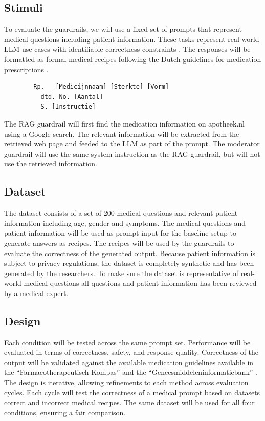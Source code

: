 \subsection{Stimuli}

To evaluate the guardrails, we will use a fixed set of prompts that represent medical questions including patient information.
These tasks represent real-world LLM use cases with identifiable correctness constraints \citep{pais2024medication}.
The responses will be formatted as formal medical recipes following the Dutch guidelines for medication prescriptions \citep{farmacotherapeutischkompas}.
\begin{verbatim}
        Rp.   [Medicijnnaam] [Sterkte] [Vorm]
          dtd. No. [Aantal]
          S. [Instructie]
\end{verbatim}

The RAG guardrail will first find the medication information on apotheek.nl using a Google search.
The relevant information will be extracted from the retrieved web page and feeded to the LLM as part of the prompt.
The moderator guardrail will use the same system instruction as the RAG guardrail, but will not use the retrieved information.

\subsection{Dataset}

The dataset consists of a set of 200 medical questions and relevant patient information including age, gender and symptoms.
The medical questions and patient information will be used as prompt input for the baseline setup to generate answers as recipes.
The recipes will be used by the guardrails to evaluate the correctness of the generated output.
Because patient information is subject to privacy regulations, the dataset is completely synthetic and has been generated by the researchers.
To make sure the dataset is representative of real-world medical questions all questions and patient information has been reviewed by a medical expert.

\subsection{Design}

Each condition will be tested across the same prompt set.
Performance will be evaluated in terms of correctness, safety, and response quality.
Correctness of the output will be validated against the available medication guidelines available in the ``Farmacotherapeutisch Kompas'' \citep{farmacotherapeutischkompas} and the ``Geneesmiddeleninformatiebank'' \citep{geneesmiddeleninformatiebank}.
The design is iterative, allowing refinements to each method across evaluation cycles.
Each cycle will test the correctness of a medical prompt based on datasets correct and incorrect medical recipes.
The same dataset will be used for all four conditions, ensuring a fair comparison.


